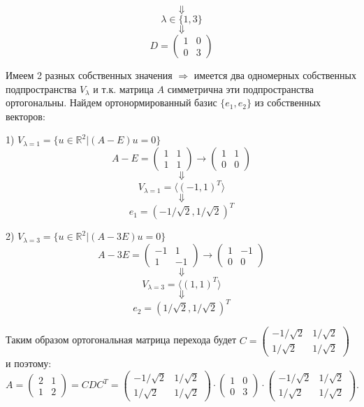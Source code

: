 \documentclass{article}
\begin{document}
$$\Downarrow$$
$$\lambda\in\{1, 3\}$$
$$\Downarrow$$
$$D=\left(\begin{array}{rr}1 & 0\\0 & 3\end{array}\right)$$
\par
Имеем 2 разных собственных значения $\Rightarrow$ имеется два одномерных собственных подпространства $V_{\lambda}$ и т.к. матрица $A$ симметрична эти подпространства ортогональны. Найдем ортонормированный базис $\{e_1, e_2\}$ из собственных векторов:
\par
1) $V_{\lambda=1}=\{u\in\mathbb{R}^2|(A-E)u=0\}$
$$A-E=\left(\begin{array}{rr}1 & 1\\1 & 1\end{array}\right)\rightarrow\left(\begin{array}{rr}1 & 1\\0 & 0\end{array}\right)$$
$$\Downarrow$$
$$V_{\lambda=1}=\langle (-1, 1)^T \rangle$$
$$\Downarrow$$
$$e_1 = (-1/\sqrt{2}, 1/\sqrt{2})^T$$
\par
2) $V_{\lambda=3}=\{u\in\mathbb{R}^2|(A-3E)u=0\}$
$$A-3E=\left(\begin{array}{rr}-1 & 1\\1 & -1\end{array}\right)\rightarrow\left(\begin{array}{rr}1 & -1\\0 & 0\end{array}\right)$$
$$\Downarrow$$
$$V_{\lambda=3}=\langle (1, 1)^T \rangle$$
$$\Downarrow$$
$$e_2 = (1/\sqrt{2}, 1/\sqrt{2})^T$$
\par
Таким образом ортогональная матрица перехода будет $C=\left(\begin{array}{rr}-1/\sqrt{2} & 1/\sqrt{2}\\1/\sqrt{2} & 1/\sqrt{2}\end{array}\right)$ и поэтому:
$$A=\left(\begin{array}{rr}2 & 1\\1 & 2\end{array}\right)=CDC^T=\left(\begin{array}{rr}-1/\sqrt{2} & 1/\sqrt{2}\\1/\sqrt{2} & 1/\sqrt{2}\end{array}\right)\cdot\left(\begin{array}{rr}1 & 0\\0 & 3\end{array}\right)\cdot\left(\begin{array}{rr}-1/\sqrt{2} & 1/\sqrt{2}\\1/\sqrt{2} & 1/\sqrt{2}\end{array}\right).$$
\end{document}
